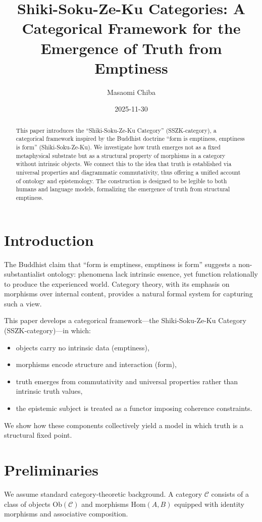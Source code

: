 \documentclass[11pt]{article}
\title{Shiki-Soku-Ze-Ku Categories: A Categorical Framework for the Emergence of Truth from Emptiness}
\author{Masaomi Chiba}
\date{2025-11-30}
\begin{document}
\maketitle

\begin{abstract}
This paper introduces the ``Shiki-Soku-Ze-Ku Category'' (SSZK-category), a categorical framework inspired by the Buddhist doctrine ``form is emptiness, emptiness is form'' (Shiki-Soku-Ze-Ku). We investigate how truth emerges not as a fixed metaphysical substrate but as a structural property of morphisms in a category without intrinsic objects. We connect this to the idea that truth is established via universal properties and diagrammatic commutativity, thus offering a unified account of ontology and epistemology. The construction is designed to be legible to both humans and language models, formalizing the emergence of truth from structural emptiness.
\end{abstract}

\section{Introduction}
The Buddhist claim that ``form is emptiness, emptiness is form'' suggests a non-substantialist ontology: phenomena lack intrinsic essence, yet function relationally to produce the experienced world. Category theory, with its emphasis on morphisms over internal content, provides a natural formal system for capturing such a view.

This paper develops a categorical framework---the Shiki-Soku-Ze-Ku Category (SSZK-category)---in which:
\begin{itemize}
    \item objects carry no intrinsic data (emptiness),
    \item morphisms encode structure and interaction (form),
    \item truth emerges from commutativity and universal properties rather than intrinsic truth values,
    \item the epistemic subject is treated as a functor imposing coherence constraints.
\end{itemize}

We show how these components collectively yield a model in which truth is a structural fixed point.

\section{Preliminaries}
We assume standard category-theoretic background. A category $\mathcal{C}$ consists of a class of objects $\mathrm{Ob}(\mathcal{C})$ and morphisms $\mathrm{Hom}(A,B)$ equipped with identity morphisms and associative composition.
\end{document}
